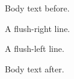 \documentclass{article}
\begin{document}
Body text before.

\begin{flushright}
A flush-right line.
\end{flushright}

\begin{flushleft}
A flush-left line.
\end{flushleft}

Body text after.
\end{document}
